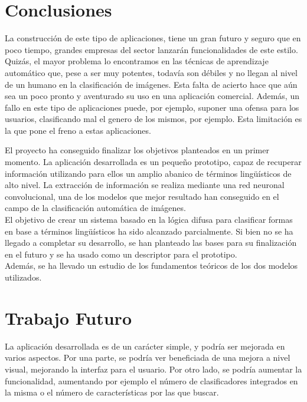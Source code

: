 \section{Conclusiones}

La construcción de este tipo de aplicaciones, tiene un gran futuro y seguro que en poco tiempo, grandes empresas del sector lanzarán funcionalidades de este estilo. Quizás, el mayor problema lo encontramos en las técnicas de aprendizaje automático que, pese a ser muy potentes, todavía son débiles y no llegan al nivel de un humano en la clasificación de imágenes. Esta falta de acierto hace que aún sea un poco pronto y aventurado su uso en una aplicación comercial. Además, un fallo en este tipo de aplicaciones puede, por ejemplo, suponer una ofensa para los usuarios, clasificando mal el genero de los mismos, por ejemplo. Esta limitación es la que pone el freno a estas aplicaciones. 

El proyecto ha conseguido finalizar los objetivos planteados en un primer momento. La aplicación desarrollada es un pequeño prototipo, capaz de recuperar información utilizando para ellos un amplio abanico de términos lingüísticos de alto nivel. La extracción de información se realiza mediante una red neuronal convolucional, una de los modelos que mejor resultado han conseguido en el campo de la clasificación automática de imágenes.\\

El objetivo de crear un sistema basado en la lógica difusa para clasificar formas en base a términos lingüísticos ha sido alcanzado parcialmente. Si bien no se ha llegado a completar su desarrollo, se han planteado las bases para su finalización en el futuro y se ha usado como un descriptor para el prototipo.\\

Además, se ha llevado un estudio de los fundamentos teóricos de los dos modelos utilizados.\\

\section{Trabajo Futuro}

La aplicación desarrollada es de un carácter simple, y podría ser mejorada en varios aspectos. Por una parte, se podría ver beneficiada de una mejora a nivel visual, mejorando la interfaz para el usuario. Por otro lado, se podría aumentar la funcionalidad, aumentando por ejemplo el número de clasificadores integrados en la misma o el número de características por las que buscar.\\

